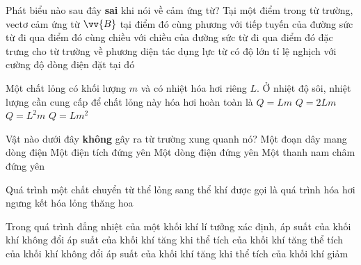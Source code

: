 	\begin{ex}%
		Phát biểu nào sau đây \textbf{sai} khi nói về cảm ứng từ? Tại một điểm trong từ trường, vectơ cảm ứng từ $\vv{B}$ tại điểm đó
		\choice
		{cùng phương với tiếp tuyến của đường sức từ đi qua điểm đó}
		{cùng chiều với chiều của đường sức từ đi qua điểm đó}
		{đặc trưng cho từ trường về phương diện tác dụng lực từ}
		{\True có độ lớn tỉ lệ nghịch với cường độ dòng điện đặt tại đó}
	\end{ex}

	\begin{ex}%
		Một chất lỏng có khối lượng $m$ và có nhiệt hóa hơi riêng $L$. Ở nhiệt độ sôi, nhiệt lượng cần cung cấp để chất lỏng này hóa hơi hoàn toàn là
		\choice
		{\True $Q=Lm$}
		{$Q=2Lm$}
		{$Q=L^2m$}
		{$Q=Lm^2$}
	\end{ex}

	\begin{ex}%
		Vật nào dưới đây \textbf{không} gây ra từ trường xung quanh nó?
		\choice
		{Một đoạn dây mang dòng điện}
		{\True Một điện tích đứng yên}
		{Một dòng điện đứng yên}
		{Một thanh nam châm đứng yên}
	\end{ex}

	\begin{ex}%
		Quá trình một chất chuyển từ thể lỏng sang thể khí được gọi là quá trình
		\choice
		{\True hóa hơi}
		{ngưng kết}
		{hóa lỏng}
		{thăng hoa}
	\end{ex}

	\begin{ex}%
		Trong quá trình đẳng nhiệt của một khối khí lí tưởng xác định,
		\choice
		{áp suất của khối khí không đổi}
		{áp suất của khối khí tăng khi thể tích của khối khí tăng}
		{thể tích của khối khí không đổi}
		{\True áp suất của khối khí tăng khi thể tích của khối khí giảm}
	\end{ex}

